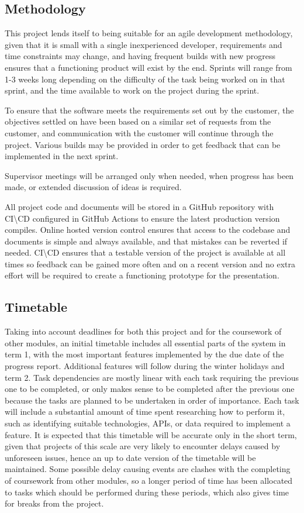 \subsection{Methodology}
This project lends itself to being suitable for an agile development methodology, given that it is small with a single inexperienced developer, requirements and time constraints may change, and having frequent builds with new progress ensures that a functioning product will exist by the end. Sprints will range from 1-3 weeks long depending on the difficulty of the task being worked on in that sprint, and the time available to work on the project during the sprint. 

To ensure that the software meets the requirements set out by the customer, the objectives settled on have been based on a similar set of requests from the customer, and communication with the customer will continue through the project. Various builds may be provided in order to get feedback that can be implemented in the next sprint.

Supervisor meetings will be arranged only when needed, when progress has been made, or extended discussion of ideas is required.

All project code and documents will be stored in a GitHub repository with CI\textbackslash CD configured in GitHub Actions to ensure the latest production version compiles. Online hosted version control ensures that access to the codebase and documents is simple and always available, and that mistakes can be reverted if needed. CI\textbackslash CD ensures that a testable version of the project is available at all times so feedback can be gained more often and on a recent version and no extra effort will be required to create a functioning prototype for the presentation.

\subsection{Timetable}
Taking into account deadlines for both this project and for the coursework of other modules, an initial timetable includes all essential parts of the system in term 1, with the most important features implemented by the due date of the progress report. Additional features will follow during the winter holidays and term 2. Task dependencies are mostly linear with each task requiring the previous one to be completed, or only makes sense to be completed after the previous one because the tasks are planned to be undertaken in order of importance. Each task will include a substantial amount of time spent researching how to perform it, such as identifying suitable technologies, APIs, or data required to implement a feature. It is expected that this timetable will be accurate only in the short term, given that projects of this scale are very likely to encounter delays caused by unforeseen issues, hence an up to date version of the timetable will be maintained. Some possible delay causing events are clashes with the completing of coursework from other modules, so a longer period of time has been allocated to tasks which should be performed during these periods, which also gives time for breaks from the project.

